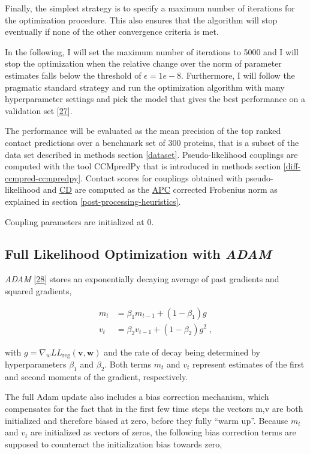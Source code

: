 \documentclass[12pt,a4paper,twoside]{book}
\newcommand{\LLreg}{L\!L_\mathrm{reg}}
\renewcommand{\v}{\mathbf{v}}
\newcommand{\w}{\mathbf{w}}
\theoremstyle{definition}
\theoremstyle{definition}
\theoremstyle{remark}
\begin{document}
Finally, the simplest strategy is to specify a maximum number of
iterations for the optimization procedure. This also ensures that the
algorithm will stop eventually if none of the other convergence criteria
is met.

In the following, I will set the maximum number of iterations to 5000
and I will stop the optimization when the relative change over the norm
of parameter estimates falls below the threshold of \(\epsilon = 1e-8\).
Furthermore, I will follow the pragmatic standard strategy and run the
optimization algorithm with many hyperparameter settings and pick the
model that gives the best performance on a validation set
{[}\protect\hyperlink{ref-Le2011}{27}{]}.

The performance will be evaluated as the mean precision of the top
ranked contact predictions over a benchmark set of 300 proteins, that is
a subset of the data set described in methods section \ref{dataset}.
Pseudo-likelihood couplings are computed with the tool CCMpredPy that is
introduced in methods section \ref{diff-ccmpred-ccmpredpy}. Contact
scores for couplings obtained with pseudo-likelihood and
\protect\hyperlink{abbrev}{CD} are computed as the
\protect\hyperlink{abbrev}{APC} corrected Frobenius norm as explained in
section \ref{post-processing-heuristics}.

Coupling parameters are initialized at 0.

\subsection{\texorpdfstring{Full Likelihood Optimization with
\emph{ADAM}}{Full Likelihood Optimization with ADAM}}\label{methods-full-likelihood-adam}

\emph{ADAM} {[}\protect\hyperlink{ref-Kingma2014}{28}{]} stores an
exponentially decaying average of past gradients and squared gradients,

\begin{align}
  m_t &= \beta_1 m_{t−1} + (1 − \beta_1) g \\
  v_t &= \beta_2 v_{t−1} + (1 − \beta_2) g^2 \; ,
\end{align}

with \(g = \nabla_w \LLreg(\v,\w)\) and the rate of decay being
determined by hyperparameters \(\beta_1\) and \(\beta_2\). Both terms
\(m_t\) and \(v_t\) represent estimates of the first and second moments
of the gradient, respectively.

The full Adam update also includes a bias correction mechanism, which
compensates for the fact that in the first few time steps the vectors
m,v are both initialized and therefore biased at zero, before they fully
``warm up''. Because \(m_t\) and \(v_t\) are initialized as vectors of
zeros, the following bias correction terms are supposed to counteract
the initialization bias towards zero,
\end{document}
